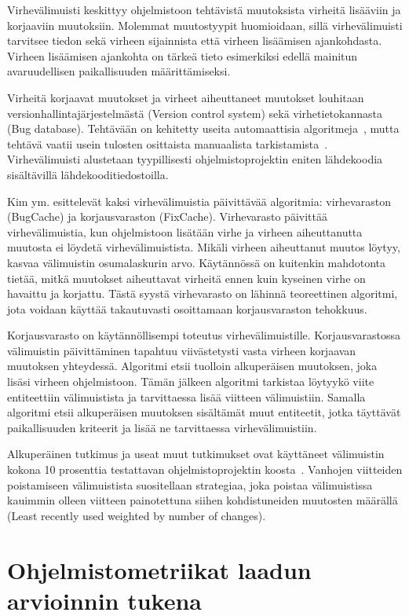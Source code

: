 \documentclass[finnish]{tktltiki2}
\theoremstyle{definition}
\theoremstyle{remark}
\begin{document}
Virhevälimuisti keskittyy ohjelmistoon tehtävistä muutoksista virheitä lisääviin ja korjaaviin muutoksiin. Molemmat muutostyypit huomioidaan, sillä virhevälimuisti tarvitsee tiedon sekä virheen sijainnista että virheen lisäämisen ajankohdasta. Virheen lisäämisen ajankohta on tärkeä tieto esimerkiksi edellä mainitun avaruudellisen paikallisuuden määrittämiseksi.

Virheitä korjaavat muutokset ja virheet aiheuttaneet muutokset louhitaan versionhallintajärjestelmästä (Version control system) sekä virhetietokannasta (Bug database). Tehtävään on kehitetty useita automaattisia algoritmeja~\cite{SZZ05, KZKW06}, mutta tehtävä vaatii usein tulosten osittaista manuaalista tarkistamista~\cite{KZWZ07}. Virhevälimuisti alustetaan tyypillisesti ohjelmistoprojektin eniten lähdekoodia sisältävillä lähdekooditiedostoilla.

Kim ym. esittelevät kaksi virhevälimuistia päivittävää algoritmia: virhevaraston (BugCache) ja korjausvaraston (FixCache). Virhevarasto päivittää virhevälimuistia, kun ohjelmistoon lisätään virhe ja virheen aiheuttanutta muutosta ei löydetä virhevälimuistista. Mikäli virheen aiheuttanut muutos löytyy, kasvaa välimuistin osumalaskurin arvo. Käytännössä on kuitenkin mahdotonta tietää, mitkä muutokset aiheuttavat virheitä ennen kuin kyseinen virhe on havaittu ja korjattu. Tästä syystä virhevarasto on lähinnä teoreettinen algoritmi, jota voidaan käyttää takautuvasti osoittamaan korjausvaraston tehokkuus.

Korjausvarasto on käytännöllisempi toteutus virhevälimuistille. Korjausvarastossa välimuistin päivittäminen tapahtuu viivästetysti vasta virheen korjaavan muutoksen yhteydessä. Algoritmi etsii tuolloin alkuperäisen muutoksen, joka lisäsi virheen ohjelmistoon. Tämän jälkeen algoritmi tarkistaa löytyykö viite entiteettiin välimuistista ja tarvittaessa lisää viitteen välimuistiin. Samalla algoritmi etsii alkuperäisen muutoksen sisältämät muut entiteetit, jotka täyttävät paikallisuuden kriteerit ja lisää ne tarvittaessa virhevälimuistiin.

Alkuperäinen tutkimus ja useat muut tutkimukset ovat käyttäneet välimuistin kokona 10 prosenttia testattavan ohjelmistoprojektin koosta~\cite{KZWZ07, WFGWW09, SLLZW11, RPHBD11}. Vanhojen viitteiden poistamiseen välimuistista suositellaan strategiaa, joka poistaa välimuistissa kauimmin olleen viitteen painotettuna siihen kohdistuneiden muutosten määrällä (Least recently used weighted by number of changes).


\section{Ohjelmistometriikat laadun arvioinnin tukena}
\end{document}
